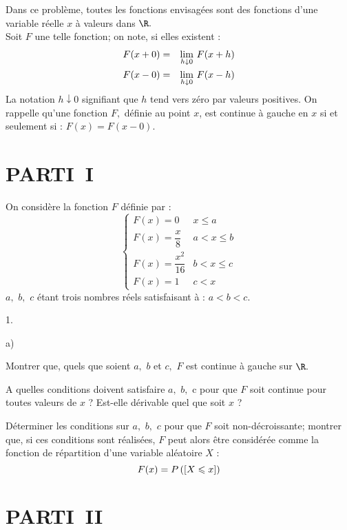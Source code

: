 \documentclass[11pt]{article}%
\begin{document}
\noindent Dans ce problème, toutes les fonctions envisagées sont des
fonctions d'une variable réelle $x$ à valeurs dans $\R.$\\
Soit $F$ une telle fonction; on note, si elles existent
:\begin{eqnarray*}
F(x + 0) & = & {\displaystyle \lim_{h\downarrow 0} \ }F(x + h) \\
F(x-0) & = & {\displaystyle \lim_{h\downarrow 0} \ }F(x-h)
\end{eqnarray*}La notation $h\downarrow 0$ signifiant que $h$ tend vers
zéro par valeurs
positives. On rappelle qu'une fonction $F,$ définie au point $x$, est
continue à gauche en $x$ si et seulement si : $F(x) = F(x-0).$

\section*{PARTI\E\ I}

On considère la fonction $F$ définie par :
\[
\left\{ 
\begin{array}{cc}
F(x) = 0 & x\leq a \\
F(x) = \dfrac{x}{8} & a<x\leq b \\
F(x) = \dfrac{x^{2}}{16} & b<x\leq c \\
F(x) = 1 & c<x
\end{array}
\right. 
\]
$a,$ $b,$ $c$ étant trois nombres réels satisfaisant à : $a<b<c.$

\begin{noliste}{1.}
 \setlength{\itemsep}{4mm}
\item 

\begin{noliste}{a)}
 \setlength{\itemsep}{2mm}
\item Montrer que, quels que soient $a,$ $b$ et $c,$ $F$ est continue à
gauche sur $\R.$

\item A quelles conditions doivent satisfaire $a,$ $b,$ c pour que $F$
soit
continue pour toutes valeurs de $x$ ? Est-elle dérivable quel que soit
$x$ ?
\end{noliste}

\item Déterminer les conditions sur $a,$ $b,$ $c$ pour que $F$ soit
non-décroissante; montrer que, si ces conditions sont réalisées, $F$
peut alors être considérée comme la fonction de répartition d'une
variable aléatoire $X$ :
\[
F(x) = P\left(\left[ {X\leqslant x} \right]\right)
\]
\end{noliste}

\section*{PARTI\E\ II}
\end{document}
